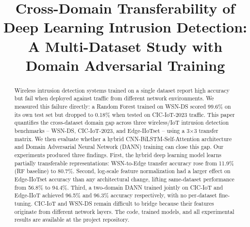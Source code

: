 \documentclass[conference]{IEEEtran}
\begin{document}
\title{Cross-Domain Transferability of Deep Learning Intrusion Detection: A Multi-Dataset Study with Domain Adversarial Training}

\author{
\and
{}
}

\maketitle

\begin{abstract}
Wireless intrusion detection systems trained on a single dataset report high accuracy but fail when deployed against traffic from different network environments. We measured this failure directly: a Random Forest trained on WSN-DS scored 99.6\% on its own test set but dropped to 0.18\% when tested on CIC-IoT-2023 traffic. This paper quantifies the cross-dataset domain gap across three wireless/IoT intrusion detection benchmarks -- WSN-DS, CIC-IoT-2023, and Edge-IIoTset -- using a 3$\times$3 transfer matrix. We then evaluate whether a hybrid CNN-BiLSTM-Self-Attention architecture and Domain Adversarial Neural Network (DANN) training can close this gap. Our experiments produced three findings. First, the hybrid deep learning model learns partially transferable representations: WSN-to-Edge transfer accuracy rose from 11.9\% (RF baseline) to 80.7\%. Second, log-scale feature normalization had a larger effect on Edge-IIoTset accuracy than any architectural change, lifting same-dataset performance from 56.8\% to 94.4\%. Third, a two-domain DANN trained jointly on CIC-IoT and Edge-IIoT achieved 96.5\% and 96.3\% accuracy respectively, with no per-dataset fine-tuning. CIC-IoT and WSN-DS remain difficult to bridge because their features originate from different network layers. The code, trained models, and all experimental results are available at the project repository.
\end{abstract}
\end{document}
